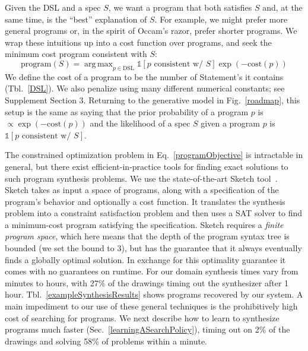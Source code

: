 \documentclass{article}
\DeclareMathOperator*{\argmin}{arg\,min} %
\DeclareMathOperator*{\argmax}{arg\,max} %
\newcommand{\indicator}{\mathds{1}} %
\newcommand{\remark}[1]{\textcolor{red}{[#1]}}
\theoremstyle{definition}
\begin{document}
Given the DSL and a spec $S$, we want a program that both satisfies $S$
and, at the same time, is the ``best'' explanation of $S$.
For example, we might prefer more general programs or, in the spirit of Occam's razor,
prefer shorter programs.
We wrap these intuitions up into a cost function over programs,
and seek the minimum cost program consistent with $S$:
\begin{equation}
    \text{program}(S) = \argmax_{p\in \text{DSL}} \indicator\left[p \text{ consistent w/ } S \right]\exp \left( -\text{cost}(p) \right)\label{programObjective}
\end{equation}
We define the
cost of a program to be the number of Statement's it contains (Tbl.~\ref{DSL}).
We also penalize using many different numerical constants; see Supplement Section 3.
Returning to the generative model in Fig.~\ref{roadmap},
this setup is the same as saying that the prior probability of a program $p$ is $\propto \exp\left(-\text{cost}(p) \right)$ and the likelihood of a spec $S$ given a program $p$ is $\indicator[p\text{ consistent w/ }S]$.

The constrained optimization problem in
Eq.~\ref{programObjective} is intractable in general, but there
exist efficient-in-practice tools for finding exact solutions to such
program synthesis problems. We use the state-of-the-art Sketch
tool~\citep{solar2008program}.
Sketch takes as input a space of programs, along with
a specification of the program's behavior and optionally a cost
function.  It translates the synthesis problem into a constraint
satisfaction problem and then uses a SAT solver to find a minimum-cost
program satisfying the specification.  Sketch requires a
 \emph{finite program space}, which here means that the depth of the
program syntax tree is bounded (we set the bound to 3),
but has the guarantee that it 
always eventually finds a globally optimal solution.
In exchange for this optimality guarantee
it comes with no guarantees
on runtime.
For our domain synthesis times vary from minutes to hours,
with 27\% of the drawings timing out the synthesizer after 1 hour.
Tbl.~\ref{exampleSynthesisResults} shows programs recovered by our system.
A main impediment to our use of these general techniques is
the prohibitively high cost of searching for programs.
We next describe how to learn to synthesize programs much faster (Sec.~\ref{learningASearchPolicy}),
timing out on 2\% of the drawings and solving 58\% of problems within a minute.
\end{document}
